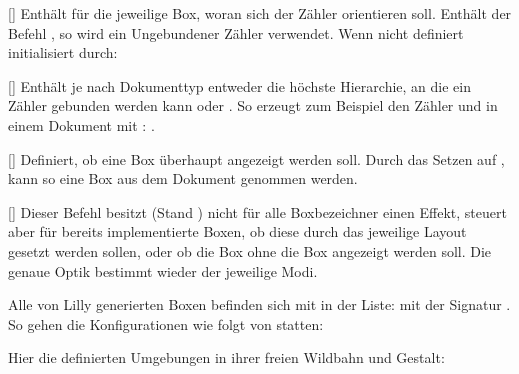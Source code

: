 %
%
%

[]
Enthält für die jeweilige Box, woran sich der Zähler orientieren soll. Enthält der Befehl \T{\true}, so wird ein Ungebundener Zähler verwendet. Wenn nicht definiert initialisiert durch:

%
%
%

[]
Enthält je nach Dokumenttyp entweder die höchste Hierarchie, an die ein Zähler gebunden werden kann oder \T{\true}. So erzeugt \T{\true} zum Beispiel den Zähler  und  in einem Dokument mit : .

%
%
%

[]
Definiert, ob eine Box überhaupt angezeigt werden soll. Durch das Setzen auf \T{\false}, kann so eine Box aus dem Dokument genommen werden.

%
%
%

[]
Dieser Befehl besitzt (Stand ) nicht für alle Boxbezeichner einen Effekt, steuert aber für bereits implementierte Boxen, ob diese durch das jeweilige Layout gesetzt werden sollen, oder ob die Box ohne die Box angezeigt werden soll. Die genaue Optik bestimmt wieder der jeweilige Modi.\newline

\begin{bemerkung}
    Alle von Lilly generierten Boxen befinden sich mit  in der Liste:  mit der Signatur . So gehen die Konfigurationen wie folgt von statten:
\end{bemerkung}

Hier die definierten Umgebungen in ihrer freien Wildbahn und Gestalt:

%

